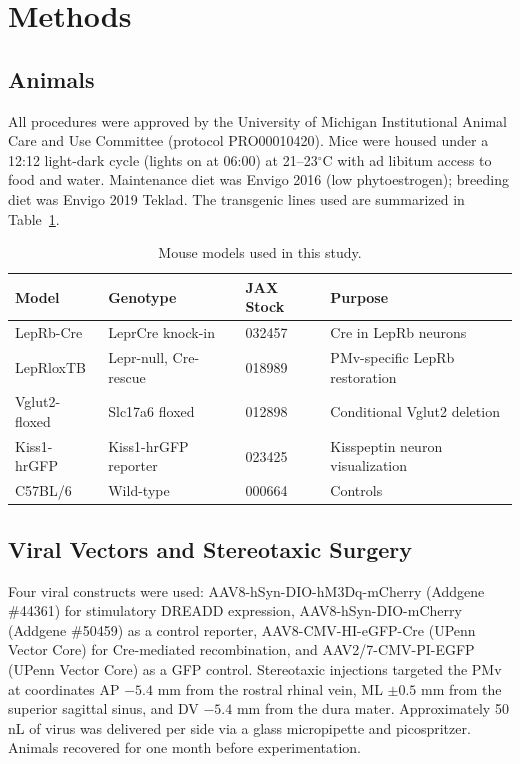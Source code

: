 \documentclass[12pt]{article}
\begin{document}
\section{Methods}

\subsection{Animals}

All procedures were approved by the University of Michigan Institutional Animal Care and Use Committee (protocol PRO00010420). Mice were housed under a 12:12 light-dark cycle (lights on at 06:00) at 21--23$^\circ$C with ad libitum access to food and water. Maintenance diet was Envigo 2016 (low phytoestrogen); breeding diet was Envigo 2019 Teklad. The transgenic lines used are summarized in Table~\ref{tab:models}.

\begin{table}[htbp]
\centering
\caption{Mouse models used in this study.}
\label{tab:models}
\begin{tabular}{llll}
\toprule
Model & Genotype & JAX Stock & Purpose \\
\midrule
LepRb-Cre & LeprCre knock-in & 032457 & Cre in LepRb neurons \\
LepRloxTB & Lepr-null, Cre-rescue & 018989 & PMv-specific LepRb restoration \\
Vglut2-floxed & Slc17a6 floxed & 012898 & Conditional Vglut2 deletion \\
Kiss1-hrGFP & Kiss1-hrGFP reporter & 023425 & Kisspeptin neuron visualization \\
C57BL/6 & Wild-type & 000664 & Controls \\
\bottomrule
\end{tabular}
\end{table}

\subsection{Viral Vectors and Stereotaxic Surgery}

Four viral constructs were used: AAV8-hSyn-DIO-hM3Dq-mCherry (Addgene \#44361) for stimulatory DREADD expression, AAV8-hSyn-DIO-mCherry (Addgene \#50459) as a control reporter, AAV8-CMV-HI-eGFP-Cre (UPenn Vector Core) for Cre-mediated recombination, and AAV2/7-CMV-PI-EGFP (UPenn Vector Core) as a GFP control. Stereotaxic injections targeted the PMv at coordinates AP $-5.4$ mm from the rostral rhinal vein, ML $\pm 0.5$ mm from the superior sagittal sinus, and DV $-5.4$ mm from the dura mater. Approximately 50 nL of virus was delivered per side via a glass micropipette and picospritzer. Animals recovered for one month before experimentation.
\end{document}
